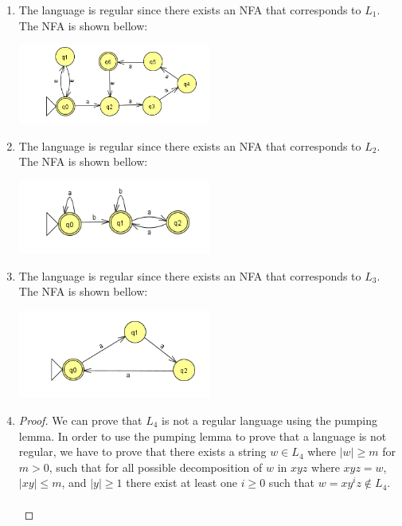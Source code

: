 \begin{enumerate}[label={(\alph*)}]
    \item The language is regular since there exists an NFA that corresponds to $L_1$. The NFA is shown bellow:
    \begin{center}
        \includegraphics[width=0.5\textwidth]{img/graph6.png}
    \end{center}
    \item The language is regular since there exists an NFA that corresponds to $L_2$. The NFA is shown bellow:
    \begin{center}
        \includegraphics[width=0.5\textwidth]{img/graph7.png}
    \end{center}
    \item The language is regular since there exists an NFA that corresponds to $L_3$. The NFA is shown bellow:
    \begin{center}
        \includegraphics[width=0.5\textwidth]{img/graph8.png}
    \end{center}
    \item
        \begin{proof}
            \noindent We can prove that $L_4$ is not a regular language using the pumping lemma. In order to use the pumping lemma to prove that a language is not regular, we have to prove that there exists a string $w \in L_4$ where $|w| \geq m$ for $m > 0$, such that for all possible decomposition of $w$ in $xyz$ where $xyz = w$, $|xy| \leq m$, and $|y| \geq 1$ there exist at least one $i \geq 0$ such that $w = xy^iz \notin L_4$.\\ \\

\end{proof}
\end{enumerate}
